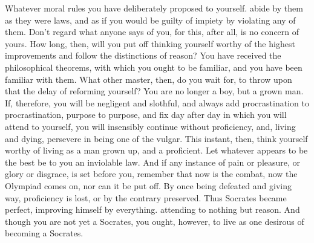 Whatever moral rules you have deliberately  proposed to yourself. abide by them
as they were laws, and as if you would be guilty of impiety by violating any of
them. Don't regard what anyone says of  you, for this, after all, is no concern
of yours.  How long,  then, will you  put off thinking  yourself worthy  of the
highest improvements and  follow the distinctions of reason?  You have received
the philosophical theorems,  with which you ought to be  familiar, and you have
been familiar  with them. What  other master, then, do  you wait for,  to throw
upon that the delay of reforming yourself? You are no longer a boy, but a grown
man.  If,  therefore, you  will  be  negligent  and  slothful, and  always  add
procrastination to procrastination,  purpose to purpose, and fix  day after day
in which  you will  attend to  yourself, you  will insensibly  continue without
proficiency, and, living and dying, persevere  in being one of the vulgar. This
instant,  then, think  yourself worthy  of  living as  a  man grown  up, and  a
proficient. Let whatever  appears to be the  best be to you  an inviolable law.
And if any  instance of pain or  pleasure, or glory or disgrace,  is set before
you, remember that now is the combat, now  the Olympiad comes on, nor can it be
put off.  By once  being defeated and  giving way, proficiency  is lost,  or by
the  contrary preserved.  Thus Socrates  became perfect,  improving himself  by
everything.  attending to  nothing but  reason. And  though you  are not  yet a
Socrates, you ought, however, to live as one desirous of becoming a Socrates.
